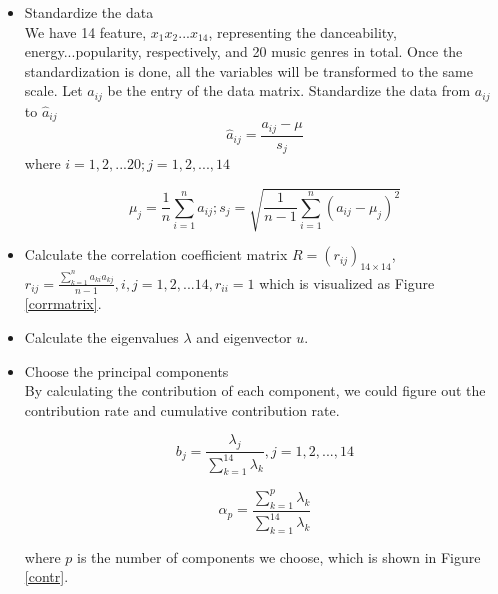 \documentclass[12pt]{article}
\begin{document}
\begin{itemize}
    \item Standardize the data\\
    We have 14 feature, $x_1 x_2...x_{14}$, representing the danceability, energy...popularity, respectively, and 20 music genres in total. 
    Once the standardization is done, all the variables will be transformed to the same scale. Let $a_{ij}$ be the entry of the data matrix. Standardize the data from $a_{ij}$ to $\hat{a}_{ij}$\\
    
    \begin{equation}
    \hat{a}_{ij}=\frac{a_{ij}-\mu}{s_j}
    \end{equation}
    where $i=1,2,...20;j=1,2,...,14$
    
    \begin{equation}
    \mu_j=\frac{1}{n}\sum_{i=1}^{n}a_{ij};s_j=\sqrt{\frac{1}{n-1}\sum_{i=1}^{n}(a_{ij}-\mu_j)^2}
    \end{equation}

    
    \item Calculate the correlation coefficient matrix
    $R=(r_{ij})_{14\times14}$, 
    $r_{ij}=\frac{\sum_{k=1}^n a_{ki}a_{kj}}{n-1},i,j=1,2,...14,r_{ii}=1$
    which is visualized as Figure \ref{corrmatrix}.\\
    
    \item Calculate the eigenvalues $\lambda$ and eigenvector $u$. \\
    \item Choose the principal components \\
    By calculating the contribution of each component, we could figure out the contribution rate and cumulative contribution rate.
    
    \begin{equation}
    b_j=\frac{\lambda_j}{\sum_{k=1}^{14}\lambda_k},j=1,2,...,14
    \end{equation}
    
    \begin{equation}
    \alpha_p=\frac{\sum_{k=1}^p\lambda_k}{\sum_{k=1}^{14}\lambda_k}
    \end{equation}

    where $p$ is the number of components we choose, which is shown in Figure \ref{contr}.\\
    
    


\end{itemize}
\end{document}
